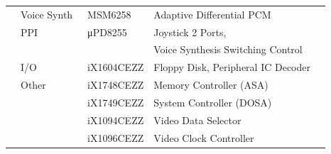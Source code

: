 \documentclass[twoside,a4paper,12pt]{article}
\begin{document}
\begin{tabular}{|p{13mm}|p{25mm}|p{22mm}|p{73mm}|p{30mm}|}
& Voice Synth & \ MSM6258 & Adaptive Differential PCM &\\
& PPI & \ μPD8255 & Joystick 2 Ports, &\\
& & & Voice Synthesis Switching Control &\\
& I/O & \ iX1604CEZZ & Floppy Disk, Peripheral IC Decoder &\\
& Other & \ iX1748CEZZ & Memory Controller (ASA) &\\
& & \ iX1749CEZZ & System Controller (DOSA) &\\
& & \ iX1094CEZZ & Video Data Selector &\\
& & \ iX1096CEZZ & Video Clock Controller &\\
\hline
\end{tabular}

\newpage
\end{document}
